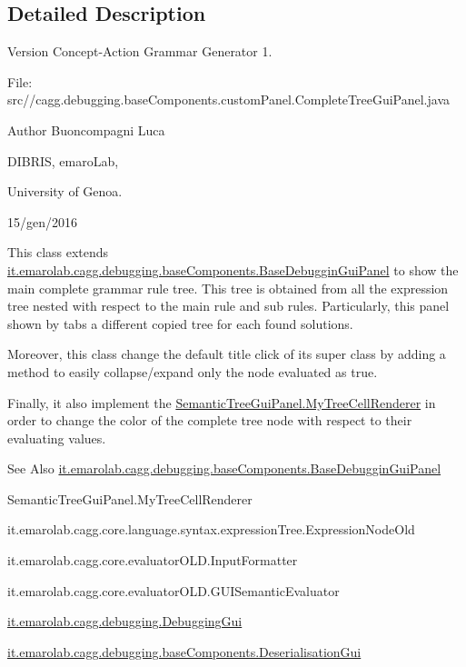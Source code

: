 \subsection{Detailed Description}
\begin{DoxyVersion}{Version}
Concept-\/\-Action Grammar Generator 1. \par
 File\-: src//cagg.debugging.\-base\-Components.\-custom\-Panel.\-Complete\-Tree\-Gui\-Panel.\-java \par

\end{DoxyVersion}
\begin{DoxyAuthor}{Author}
Buoncompagni Luca \par
 D\-I\-B\-R\-I\-S, emaro\-Lab,\par
 University of Genoa. \par
 15/gen/2016 \par

\end{DoxyAuthor}


This class extends \hyperlink{classit_1_1emarolab_1_1cagg_1_1debugging_1_1baseComponents_1_1BaseDebugginGuiPanel}{it.\-emarolab.\-cagg.\-debugging.\-base\-Components.\-Base\-Debuggin\-Gui\-Panel} to show the main complete grammar rule tree. This tree is obtained from all the expression tree nested with respect to the main rule and sub rules. Particularly, this panel shown by tabs a different copied tree for each found solutions.\par
 Moreover, this class change the default title click of its super class by adding a method to easily collapse/expand only the node evaluated as true.\par
 Finally, it also implement the \hyperlink{}{Semantic\-Tree\-Gui\-Panel.\-My\-Tree\-Cell\-Renderer} in order to change the color of the complete tree node with respect to their evaluating values. 

\begin{DoxySeeAlso}{See Also}
\hyperlink{classit_1_1emarolab_1_1cagg_1_1debugging_1_1baseComponents_1_1BaseDebugginGuiPanel}{it.\-emarolab.\-cagg.\-debugging.\-base\-Components.\-Base\-Debuggin\-Gui\-Panel} 

Semantic\-Tree\-Gui\-Panel.\-My\-Tree\-Cell\-Renderer 

it.\-emarolab.\-cagg.\-core.\-language.\-syntax.\-expression\-Tree.\-Expression\-Node\-Old 

it.\-emarolab.\-cagg.\-core.\-evaluator\-O\-L\-D.\-Input\-Formatter 

it.\-emarolab.\-cagg.\-core.\-evaluator\-O\-L\-D.\-G\-U\-I\-Semantic\-Evaluator 

\hyperlink{classit_1_1emarolab_1_1cagg_1_1debugging_1_1DebuggingGui}{it.\-emarolab.\-cagg.\-debugging.\-Debugging\-Gui} 

\hyperlink{classit_1_1emarolab_1_1cagg_1_1debugging_1_1baseComponents_1_1DeserialisationGui}{it.\-emarolab.\-cagg.\-debugging.\-base\-Components.\-Deserialisation\-Gui} 
\end{DoxySeeAlso}


